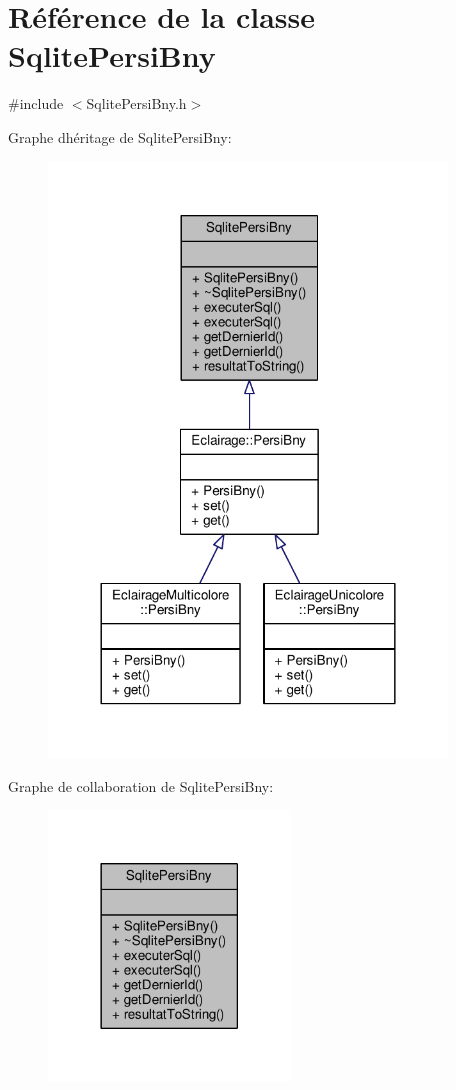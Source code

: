 \hypertarget{classSqlitePersiBny}{}\section{Référence de la classe Sqlite\+Persi\+Bny}
\label{classSqlitePersiBny}


{\ttfamily \#include $<$Sqlite\+Persi\+Bny.\+h$>$}



Graphe d\textquotesingle{}héritage de Sqlite\+Persi\+Bny\+:
\nopagebreak
\begin{figure}[H]
\begin{center}
\leavevmode
\includegraphics[width=300pt]{classSqlitePersiBny__inherit__graph}
\end{center}
\end{figure}


Graphe de collaboration de Sqlite\+Persi\+Bny\+:
\nopagebreak
\begin{figure}[H]
\begin{center}
\leavevmode
\includegraphics[width=182pt]{classSqlitePersiBny__coll__graph}
\end{center}
\end{figure}
